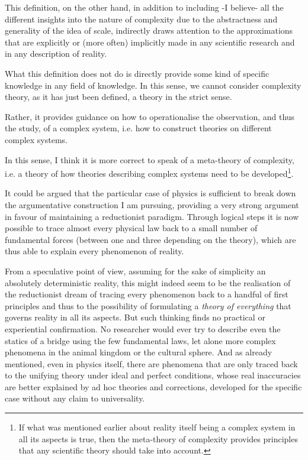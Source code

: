 \documentclass[a4paper, headings=standardclasses]{scrartcl}
\begin{document}
This definition, on the other hand, in addition to including -I believe- all the different insights into the nature of complexity due to the abstractness and generality of the idea of scale, indirectly draws attention to the approximations that are explicitly or (more often) implicitly made in any scientific research and in any description of reality.

What this definition does not do is directly provide some kind of specific knowledge in any field of knowledge.
In this sense, we cannot consider complexity theory, as it has just been defined, a theory in the strict sense.

Rather, it provides guidance on how to operationalise the observation, and thus the study, of a complex system, i.e. how to construct theories on different complex systems.

In this sense, I think it is more correct to speak of a meta-theory of complexity, i.e. a theory of how theories describing complex systems need to be developed\footnote{If what was mentioned earlier about reality itself being a complex system in all its aspects is true, then the meta-theory of complexity provides principles that any scientific theory should take into account.}.

It could be argued that the particular case of physics is sufficient to break down the argumentative construction I am pursuing, providing a very strong argument in favour of maintaining a reductionist paradigm.
Through logical steps it is now possible to trace almost every physical law back to a small number of fundamental forces (between one and three depending on the theory), which are thus able to explain every phenomenon of reality.

From a speculative point of view, assuming for the sake of simplicity an absolutely deterministic reality, this might indeed seem to be the realisation of the reductionist dream of tracing every phenomenon back to a handful of first principles and thus to the possibility of formulating a \textit{theory of everything} that governs reality in all its aspects. But such thinking finds no practical or experiential confirmation.
No researcher would ever try to describe even the statics of a bridge using the few fundamental laws, let alone more complex phenomena in the animal kingdom or the cultural sphere.
And as already mentioned, even in physics itself, there are phenomena that are only traced back to the unifying theory under ideal and perfect conditions, whose real inaccuracies are better explained by ad hoc theories and corrections, developed for the specific case without any claim to universality.
\end{document}
